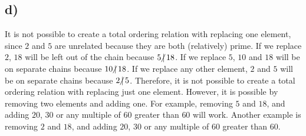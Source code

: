 \documentclass[12pt]{article}
\newcommand{\+}{\mkern2mu}
\newcommand{\ndiv}{\hspace{-4pt}\not|\hspace{2pt}}
\begin{document}
\subsection*{d) }
It is not possible to create a total ordering relation with replacing one element, since $2$ and $5$ are unrelated because they are both (relatively) prime.
If we replace $2$, $18$ will be left out of the chain because $5 \ndiv 18$.
If we replace $5$, $10$ and $18$ will be on separate chains because $10 \ndiv 18$.
If we replace any other element, $2$ and $5$ will be on separate chains because $2 \ndiv 5$.
Therefore, it is not possible to create a total ordering relation with replacing just one element.
However, it is possible by removing two elements and adding one.
For example, removing $5$ and $18$, and adding $20$, $30$ or any multiple of $60$ greater than $60$ will work.
Another example is removing $2$ and $18$, and adding $20$, $30$ or any multiple of $60$ greater than $60$.
\end{document}
